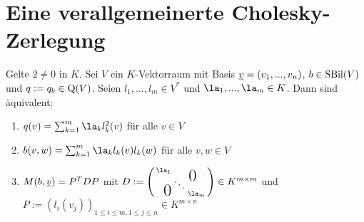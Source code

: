 \documentclass[../../main.tex]{subfiles}
\begin{document}
\section{Eine verallgemeinerte Cholesky-Zerlegung}

\begin{lem}\label{13.5.1}
Gelte $2\neq 0$ in $K$. Sei $V$ ein $K$-Vektorraum mit Basis ${\underline v}=(v_1,...,v_n)$, $b\in \operatorname{SBil}(V)$ und $q:=q_b\in \operatorname{Q}(V)$. Seien $l_1,...,l_m\in V^*$ und $\la_1,...,\la_m\in K$. Dann sind äquivalent:
\begin{enumerate}[\normalfont(a)]
\item $q(v)=\sum_{k=1}^m\la_k l_k^2(v)$ für alle $v\in V$
\item $b(v,w)=\sum_{k=1}^m\la_k l_k(v)l_k(w)$ für alle $v,w\in V$
\item $M(b,{\underline v})=P^TDP$ mit $D:=\left(\begin{smallmatrix}
\la_1 & & \llap{$\overset{\blap{\LARGE 0}}{~}$} \\
& \ddots &\\
\rlap{\tlap{\LARGE 0}} & & \la_m\end{smallmatrix}\right)\in K^{m\times m}$ und $P:=(l_i(v_j))_{1\le i\le m, 1\le j\le n}\in K^{m\times n}$
\end{enumerate}
\end{lem}
\end{document}
